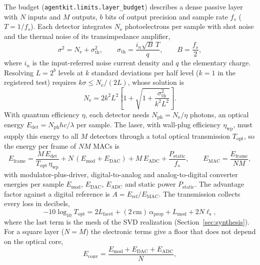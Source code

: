 \documentclass[11pt,a4paper]{article}
\newcommand{\Ne}{N_\mathrm{e}}
\begin{document}
The budget (\texttt{agentkit.limits.layer\_budget}) describes a dense passive layer with $N$ inputs and $M$ outputs, $b$ bits of output precision and sample rate $f_s$ ($T=1/f_s$). Each detector integrates $\Ne$ photoelectrons per sample with shot noise and the thermal noise of its transimpedance amplifier,
\begin{equation}
\sigma^2=\Ne+\sigma_\mathrm{th}^2,\qquad \sigma_\mathrm{th}=\frac{i_n\sqrt{B}\,T}{q},\qquad B=\frac{f_s}{2},
\label{eq:noise}
\end{equation}
where $i_n$ is the input-referred noise current density and $q$ the elementary charge. Resolving $L=2^b$ levels at $k$ standard deviations per half level ($k=1$ in the registered test) requires $k\sigma\le\Ne/(2L)$, whose solution is
\begin{equation}
\Ne=2k^2L^2\left[1+\sqrt{1+\frac{\sigma_\mathrm{th}^2}{k^2L^2}}\right].
\label{eq:ne}
\end{equation}
With quantum efficiency $\eta$, each detector needs $N_\mathrm{ph}=\Ne/\eta$ photons, an optical energy $E_\mathrm{det}=N_\mathrm{ph}hc/\lambda$ per sample. The laser, with wall-plug efficiency $\eta_\mathrm{wp}$, must supply this energy to all $M$ detectors through a total optical transmission $T_\mathrm{opt}$, so the energy per frame of $NM$ MACs is
\begin{equation}
E_\mathrm{frame}=\frac{M\,E_\mathrm{det}}{T_\mathrm{opt}\,\eta_\mathrm{wp}}+N\,(E_\mathrm{mod}+E_\mathrm{DAC})+M\,E_\mathrm{ADC}+\frac{P_\mathrm{static}}{f_s},
\qquad E_\mathrm{MAC}=\frac{E_\mathrm{frame}}{NM},
\label{eq:frame}
\end{equation}
with modulator-plus-driver, digital-to-analog and analog-to-digital converter energies per sample $E_\mathrm{mod}$, $E_\mathrm{DAC}$, $E_\mathrm{ADC}$ and static power $P_\mathrm{static}$. The advantage factor against a digital reference is $A=E_\mathrm{ref}/E_\mathrm{MAC}$. The transmission collects every loss in decibels,
\begin{equation}
-10\log_{10}T_\mathrm{opt}=2L_\mathrm{facet}+(2\,\mathrm{cm})\,\alpha_\mathrm{prop}+L_\mathrm{mod}+2N\ell_\mathrm{s},
\label{eq:transmission}
\end{equation}
where the last term is the mesh of the SVD realization (Section~\ref{sec:synthesis}). For a square layer ($N=M$) the electronic terms give a floor that does not depend on the optical core,
\begin{equation}
E_\mathrm{conv}=\frac{E_\mathrm{mod}+E_\mathrm{DAC}+E_\mathrm{ADC}}{N},
\label{eq:floor}
\end{equation}
\end{document}
